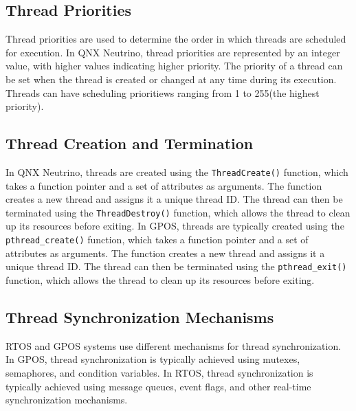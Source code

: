 \documentclass{article}
\begin{document}
\subsection{Thread Priorities}
\label{sec:thread-priorities}
Thread priorities are used to determine the order in which threads are scheduled for execution.
In QNX Neutrino, thread priorities are represented by an integer value, with higher values indicating higher priority.
The priority of a thread can be set when the thread is created or changed at any time during its execution.
Threads can have scheduling prioritiews ranging from 1 to 255(the highest priority).\cite{PriorityScheduling}


\subsection{Thread Creation and Termination}
\label{sec:thread-creation}
In QNX Neutrino, threads are created using the \texttt{ThreadCreate()} function, which takes a function pointer and a set of attributes as arguments.
The function creates a new thread and assigns it a unique thread ID.
The thread can then be terminated using the \texttt{ThreadDestroy()} function, which allows the thread to clean up its resources before exiting.
In GPOS, threads are typically created using the \texttt{pthread\_create()} function, which takes a function pointer and a set of attributes as arguments.
The function creates a new thread and assigns it a unique thread ID.
The thread can then be terminated using the \texttt{pthread\_exit()} function, which allows the thread to clean up its resources before exiting.\cite{ThreadsAndProcesses}

\subsection{Thread Synchronization Mechanisms}
\label{sec:thread-synchronization}
RTOS and GPOS systems use different mechanisms for thread synchronization.
In GPOS, thread synchronization is typically achieved using mutexes, semaphores, and condition variables.
In RTOS, thread synchronization is typically achieved using message queues, event flags, and other real-time synchronization mechanisms.\cite{ThreadSynchronization}
\FloatBarrier
\end{document}
